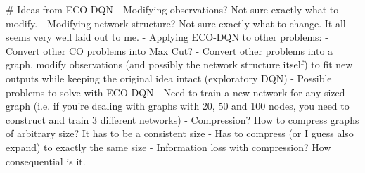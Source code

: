 \documentclass{article}
\begin{document}
# Ideas from ECO-DQN
- Modifying observations? Not sure exactly what to modify.
- Modifying network structure? Not sure exactly what to change. It all seems very well laid out to me.
- Applying ECO-DQN to other problems:
	- Convert other CO problems into Max Cut?
	- Convert other problems into a graph, modify observations (and possibly the network structure itself) to fit new outputs while keeping the original idea intact (exploratory DQN)
- Possible problems to solve with ECO-DQN
	- Need to train a new network for any sized graph (i.e. if you're dealing with graphs with 20, 50 and 100 nodes, you need to construct and train 3 different networks)
		- Compression? How to compress graphs of arbitrary size? It has to be a consistent size
		- Has to compress (or I guess also expand) to exactly the same size
		- Information loss with compression? How consequential is it.
\end{document}

